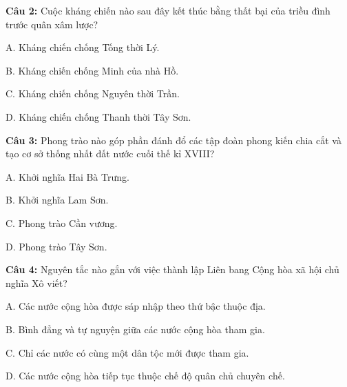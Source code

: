 \documentclass[12pt,a4paper]{article}
\begin{document}
\par\noindent\begin{minipage}{\linewidth}
\noindent\textbf{Câu 2:} Cuộc kháng chiến nào sau đây kết thúc bằng thất bại của triều đình trước quân xâm lược?\par
\noindent A. Kháng chiến chống Tống thời Lý.\par
\noindent B. Kháng chiến chống Minh của nhà Hồ.\par
\noindent C. Kháng chiến chống Nguyên thời Trần.\par
\noindent D. Kháng chiến chống Thanh thời Tây Sơn.\par
\end{minipage}\par\vspace{0.12cm}

\par\noindent\begin{minipage}{\linewidth}
\noindent\textbf{Câu 3:} Phong trào nào góp phần đánh đổ các tập đoàn phong kiến chia cắt và tạo cơ sở thống nhất đất nước cuối thế kỉ XVIII?\par
\noindent A. Khởi nghĩa Hai Bà Trưng.\par
\noindent B. Khởi nghĩa Lam Sơn.\par
\noindent C. Phong trào Cần vương.\par
\noindent D. Phong trào Tây Sơn.\par
\end{minipage}\par\vspace{0.12cm}

\par\noindent\begin{minipage}{\linewidth}
\noindent\textbf{Câu 4:} Nguyên tắc nào gắn với việc thành lập Liên bang Cộng hòa xã hội chủ nghĩa Xô viết?\par
\noindent A. Các nước cộng hòa được sáp nhập theo thứ bậc thuộc địa.\par
\noindent B. Bình đẳng và tự nguyện giữa các nước cộng hòa tham gia.\par
\noindent C. Chỉ các nước có cùng một dân tộc mới được tham gia.\par
\noindent D. Các nước cộng hòa tiếp tục thuộc chế độ quân chủ chuyên chế.\par
\end{minipage}\par\vspace{0.12cm}
\end{document}
